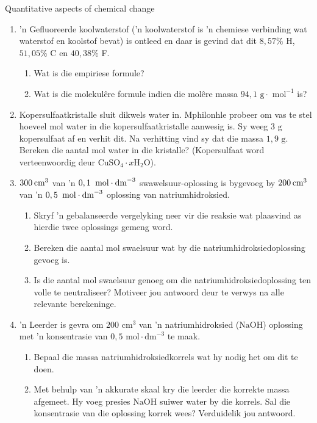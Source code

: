 \begin{eocexercises}{Quantitative aspects of chemical change}
\begin{enumerate}[noitemsep, label=\textbf{\arabic*}. ]
\item  'n Gefluoreerde koolwaterstof ('n koolwaterstof is 'n chemiese verbinding wat waterstof en koolstof bevat) is ontleed en daar is gevind dat dit $8,57\%$ H, $51,05\%$ C en $40,38\%$ F.
 \begin{enumerate}[noitemsep, label=\textbf{\alph*}. ] 
 \item Wat is die empiriese formule?
 \item Wat is die molekulêre formule indien die mol\^{e}re massa $94,1\text{ g}\cdot {\text{ mol}}^{-1}$ is?
 \end{enumerate}
\item Kopersulfaatkristalle sluit dikwels water in. Mphilonhle probeer om vas te stel hoe\-veel mol water in die kopersulfaatkristalle aanwesig is. Sy weeg $3 \text{ g}$ kopersulfaat af en verhit dit. Na verhitting vind sy dat die massa $1,9 \text{ g}$. Bereken die aantal mol water in die kristalle? (Kopersulfaat word verteenwoordig deur ${\text{CuSO}}_{4}\cdot x{\text{H}}_{2}\text{O}$).        
\item $300\phantom{\rule{2pt}{0ex}}{\text{cm}}^{3}$ van 'n $0,1\phantom{\rule{2pt}{0ex}}\text{ mol}\ensuremath{\cdot}{\text{dm}}^{-3}$ swawelsuur-oplossing is bygevoeg by $200\phantom{\rule{2pt}{0ex}}{\text{cm}}^{3}$ van 'n $0,5\phantom{\rule{2pt}{0ex}}\text{ mol}\ensuremath{\cdot}{\text{dm}}^{-3}$ oplossing van natriumhidroksied.
 \begin{enumerate}[noitemsep, label=\textbf{\alph*}. ] 
 \item Skryf 'n gebalanseerde vergelyking neer vir die reaksie wat plaasvind as hierdie twee oplossings gemeng word.
 \item Bereken die aantal mol swaelsuur wat by die natriumhidroksiedoplossing gevoeg is.
 \item Is die aantal mol swaelsuur genoeg om die natriumhidroksiedoplossing ten volle te neutraliseer? Motiveer jou antwoord deur te verwys na alle relevante berekeninge.
 \end{enumerate}
\item 'n Leerder is gevra om $200 {\text{ cm}}^{3}$ van  'n natriumhidroksied ($\text{NaOH}$) oplossing met  'n konsentrasie van $0,5 \text{ mol} \cdot {\text{dm}}^{-3}$ te maak.
 \begin{enumerate}[noitemsep, label=\textbf{\alph*}. ] 
 \item Bepaal die massa natriumhidroksiedkorrels wat hy nodig het om dit te doen.
 \item Met behulp van 'n akkurate skaal kry die leerder die korrekte massa afgemeet. Hy voeg presies $\text{NaOH}$ suiwer water by die korrels. Sal die konsentrasie van die oplossing korrek wees? Verduidelik jou antwoord. 

\end{enumerate}
\end{enumerate}
\end{eocexercises}
